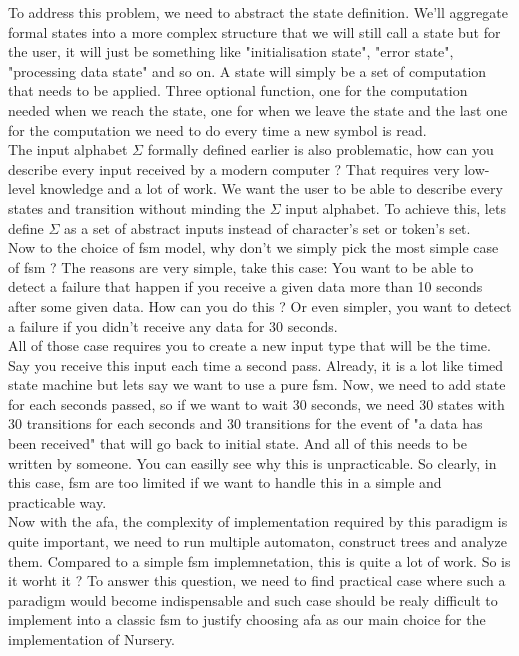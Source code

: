 \documentclass[12pt]{article}
\begin{document}
To address this problem, we need to abstract the state definition. We'll aggregate formal states into a more complex structure that we will still call a state but for the user, it will just be something like "initialisation state", "error state", "processing data state" and so on. A state will simply be a set of computation that needs to be applied. Three optional function, one for the computation needed when we reach the state, one for when we leave the state and the last one for the computation we need to do every time a new symbol is read.\\

The input alphabet $\Sigma$ formally defined earlier is also problematic, how can you describe every input received by a modern computer ? That requires very low-level knowledge and a lot of work. We want the user to be able to describe every states and transition without minding the $\Sigma$ input alphabet. To achieve this, lets define $\Sigma$ as a set of abstract inputs instead of character's set or token's set.\\

Now to the choice of \gls{fsm} model, why don't we simply pick the most simple case of \gls{fsm} ? The reasons are very simple, take this case: You want to be able to detect a failure that happen if you receive a given data more than 10 seconds after some given data. How can you do this ? Or even simpler, you want to detect a failure if you didn't receive any data for 30 seconds.\\

All of those case requires you to create a new input type that will be the time. Say you receive this input each time a second pass. Already, it is a lot like timed state machine but lets say we want to use a pure \gls{fsm}. Now, we need to add state for each seconds passed, so if we want to wait 30 seconds, we need 30 states with 30 transitions for each seconds and 30 transitions for the event of "a data has been received" that will go back to initial state. And all of this needs to be written by someone. You can easilly see why this is unpracticable. So clearly, in this case, \gls{fsm} are too limited if we want to handle this in a simple and practicable way.\\

Now with the \gls{afa}, the complexity of implementation required by this paradigm is quite important, we need to run multiple automaton, construct trees and analyze them. Compared to a simple \gls{fsm} implemnetation, this is quite a lot of work. So is it worht it ? To answer this question, we need to find practical case where such a paradigm would become indispensable and such case should be realy difficult to implement into a classic \gls{fsm} to justify choosing \gls{afa} as our main choice for the implementation of Nursery.\\
\end{document}
